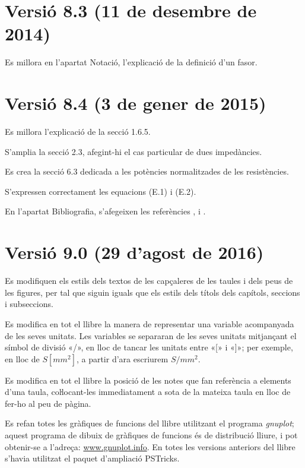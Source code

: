 \section*{Versió 8.3 (11 de desembre de 2014)}

Es millora en l'apartat Notació, l'explicació de la definició d'un fasor.


\section*{Versió 8.4 (3 de gener de 2015)}

Es millora l'explicació de la secció 1.6.5.

S'amplia la secció 2.3, afegint-hi el cas particular de dues impedàncies.

Es crea la secció 6.3 dedicada a les potències normalitzades de les resistències.

S'expressen correctament les equacions (E.1) i (E.2).

En l'apartat Bibliografia, s'afegeixen les referències \cite{AGVS}, \cite{JSch} i \cite{RRop}.


\section*{Versió 9.0 (29 d’agost de 2016)}

Es modifiquen els estils dels textos de les capçaleres de les taules i dels peus de les figures, per tal que siguin iguals que els estils dels títols dels capítols, seccions i subseccions.

Es modifica en tot el llibre la manera de representar una variable acompanyada de les seves unitats. Les variables se separaran de les seves unitats mitjançant el símbol de divisió «/», en lloc de tancar les unitats entre «[» i  «]»; per exemple, en lloc de $S\unit{[mm^2]}$, a partir d'ara escriurem $S/\unit{mm^2}$.

Es modifica en tot el llibre la posició de les notes que fan referència a elements d'una taula, coŀlocant-les immediatament a sota de la mateixa taula en lloc de fer-ho al peu de pàgina.

Es refan totes les gràfiques de funcions del llibre utilitzant el programa \emph{gnuplot}; aquest programa de dibuix de gràfiques de funcions és de distribució lliure, i pot obtenir-se a l'adreça: \href{http://www.gnuplot.info/}{www.gnuplot.info}. En totes les versions anteriors del llibre s'havia utilitzat el paquet d'ampliació  PSTricks.

